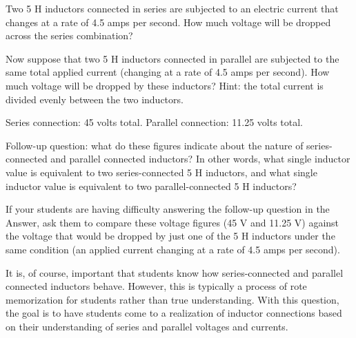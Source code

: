 

Two 5 H inductors connected in series are subjected to an electric current that changes at a rate of 4.5 amps per second.  How much voltage will be dropped across the series combination?

Now suppose that two 5 H inductors connected in parallel are subjected to the same total applied current (changing at a rate of 4.5 amps per second).  How much voltage will be dropped by these inductors?  Hint: the total current is divided evenly between the two inductors.







Series connection: 45 volts total.  Parallel connection: 11.25 volts total.  

\vskip 10pt

Follow-up question: what do these figures indicate about the nature of series-connected and parallel connected inductors?  In other words, what single inductor value is equivalent to two series-connected 5 H inductors, and what single inductor value is equivalent to two parallel-connected 5 H inductors?







If your students are having difficulty answering the follow-up question in the Answer, ask them to compare these voltage figures (45 V and 11.25 V) against the voltage that would be dropped by just one of the 5 H inductors under the same condition (an applied current changing at a rate of 4.5 amps per second).

It is, of course, important that students know how series-connected and parallel connected inductors behave.  However, this is typically a process of rote memorization for students rather than true understanding.  With this question, the goal is to have students come to a realization of inductor connections based on their understanding of series and parallel voltages and currents.




